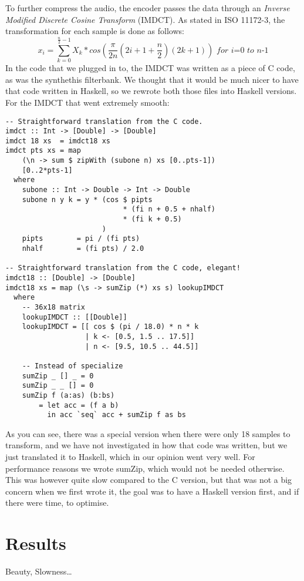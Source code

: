 \documentclass[a4paper,12pt]{article}
\begin{document}
        To further compress the audio, the encoder passes the data through an
        \textit{Inverse Modified Discrete Cosine Transform} (IMDCT). As stated
        in ISO 11172-3, the transformation for each sample is done as follows:
        \[
            x_i = \sum_{k=0}^{\frac{n}{2} - 1}{X_k * cos(\frac{\pi}{2n}(2i + 1 +
                  \frac{n}{2})(2k + 1))}
            \textit{ for i=0 to n-1}
        \]
        In the code that we plugged in to, the IMDCT was written as a piece of C
        code, as was the synthethis filterbank. We thought that it would be much
        nicer to have that code written in Haskell, so we rewrote both those
        files into Haskell versions. For the IMDCT that went extremely smooth:
        \begin{lstlisting}
-- Straightforward translation from the C code.
imdct :: Int -> [Double] -> [Double]
imdct 18 xs  = imdct18 xs
imdct pts xs = map
    (\n -> sum $ zipWith (subone n) xs [0..pts-1])
    [0..2*pts-1]
  where
    subone :: Int -> Double -> Int -> Double
    subone n y k = y * (cos $ pipts
                            * (fi n + 0.5 + nhalf)
                            * (fi k + 0.5)
                       )
    pipts        = pi / (fi pts)
    nhalf        = (fi pts) / 2.0

-- Straightforward translation from the C code, elegant!
imdct18 :: [Double] -> [Double]
imdct18 xs = map (\s -> sumZip (*) xs s) lookupIMDCT
  where
    -- 36x18 matrix
    lookupIMDCT :: [[Double]]
    lookupIMDCT = [[ cos $ (pi / 18.0) * n * k
                   | k <- [0.5, 1.5 .. 17.5]]
                   | n <- [9.5, 10.5 .. 44.5]]

    -- Instead of specialize
    sumZip _ [] _ = 0
    sumZip _ _ [] = 0
    sumZip f (a:as) (b:bs)
        = let acc = (f a b)
          in acc `seq` acc + sumZip f as bs
        \end{lstlisting}
        As you can see, there was a special version when there were only 18
        samples to transform, and we have not investigated in how that code was
        written, but we just translated it to Haskell, which in our opinion went
        very well. For performance reasons we wrote sumZip, which would not be
        needed otherwise. This was however quite slow compared to the C version,
        but that was not a big concern when we first wrote it, the goal was to
        have a Haskell version first, and if there were time, to optimise.

\section{Results}
    Beauty, Slowness\ldots
\end{document}
